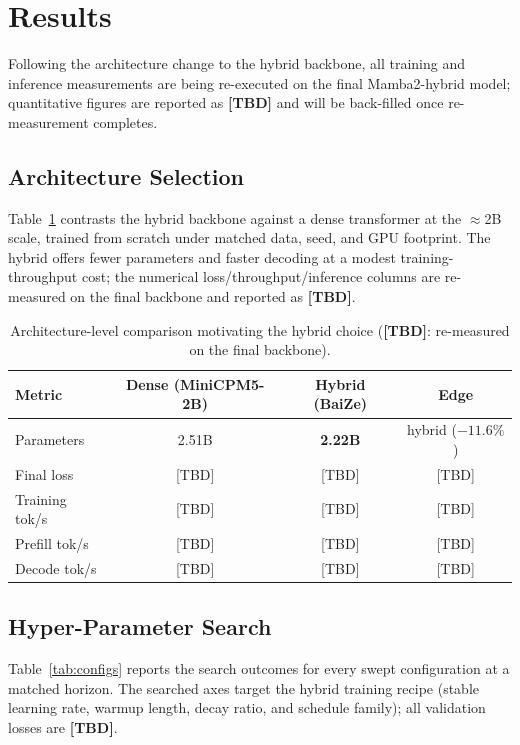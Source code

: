 \section{Results}

Following the architecture change to the hybrid backbone, all training and inference measurements are being re-executed on the final Mamba2-hybrid model; quantitative figures are reported as \textbf{[TBD]} and will be back-filled once re-measurement completes.

\subsection{Architecture Selection}\label{sec:archsel}
Table~\ref{tab:archcomp} contrasts the hybrid backbone against a dense transformer at the $\approx$2B scale, trained from scratch under matched data, seed, and GPU footprint.
The hybrid offers fewer parameters and faster decoding at a modest training-throughput cost; the numerical loss/throughput/inference columns are re-measured on the final backbone and reported as \textbf{[TBD]}.

\begin{table}[htbp]
\centering
\caption{Architecture-level comparison motivating the hybrid choice (\textbf{[TBD]}: re-measured on the final backbone).}
\label{tab:archcomp}
\begin{tabular}{lccc}
\toprule
\textbf{Metric} & \textbf{Dense (MiniCPM5-2B)} & \textbf{Hybrid (BaiZe)} & \textbf{Edge} \\
\midrule
Parameters & 2.51B & \textbf{2.22B} & hybrid ($-11.6\%$) \\
Final loss & [TBD] & [TBD] & [TBD] \\
Training tok/s & [TBD] & [TBD] & [TBD] \\
Prefill tok/s & [TBD] & [TBD] & [TBD] \\
Decode tok/s & [TBD] & [TBD] & [TBD] \\
\bottomrule
\end{tabular}
\end{table}

\subsection{Hyper-Parameter Search}\label{sec:hpsearch}
Table~\ref{tab:configs} reports the search outcomes for every swept configuration at a matched horizon.
The searched axes target the hybrid training recipe (stable learning rate, warmup length, decay ratio, and schedule family); all validation losses are \textbf{[TBD]}.

